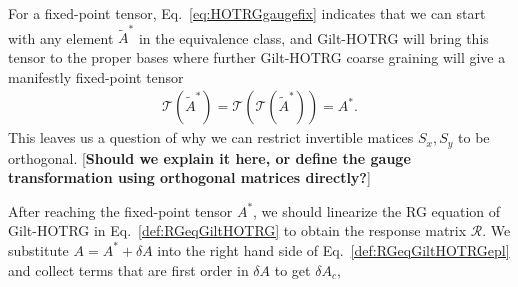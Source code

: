 \documentclass[aps,prb,reprint,superscriptaddress]{revtex4-2}
\begin{document}
For a fixed-point tensor, Eq.~\eqref{eq:HOTRGgaugefix} indicates that we
can start with any element $\tilde{A}^*$ in the equivalence class, and
Gilt-HOTRG will bring this tensor to the proper bases where further
Gilt-HOTRG coarse graining will give a manifestly fixed-point tensor
%
\begin{align}\label{eq:GiltHOTRGfixT}
    \mathcal{T}(\tilde{A}^*) =
    \mathcal{T}\left(\mathcal{T}(\tilde{A}^*)  \right) = A^*.
\end{align}
%
This leaves us a question of why we can restrict invertible matices
$S_x, S_y$ to be orthogonal. [\textbf{Should we explain it here, or
define the gauge transformation using orthogonal matrices directly?}]
%

After reaching the fixed-point tensor $A^*$, we should linearize the RG
equation of Gilt-HOTRG in Eq.~\eqref{def:RGeqGiltHOTRG} to obtain the
response matrix $\mathcal{R}$. We substitute $A = A^* + \delta A$ into
the right hand side of Eq.~\eqref{def:RGeqGiltHOTRGepl} and collect
terms that are first order in $\delta A$ to get $\delta A_c$,
%
\end{document}
